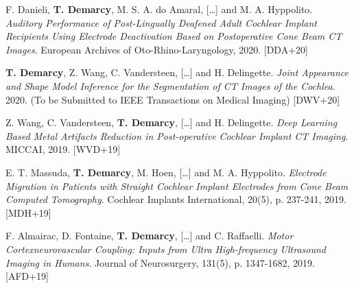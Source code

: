 



\begin{cvhonors}

  \cvhonor
    {F. Danieli, \textbf{T. Demarcy}, M. S. A. do Amaral, [\ldots] and M. A. Hyppolito.  \textit{Auditory Performance of Post-Lingually Deafened Adult Cochlear Implant Recipients Using Electrode Deactivation Based on Postoperative Cone Beam CT Images}. European Archives of Oto-Rhino-Laryngology, 2020.} %
    {\hypertarget{DDA+20}{[DDA+20]}} %

  \cvhonor
    {\textbf{T. Demarcy}, Z. Wang, C. Vandersteen, [\ldots] and H. Delingette.  \textit{Joint Appearance and Shape Model Inference for the Segmentation of CT Images of the Cochlea}. 2020. (To be Submitted to IEEE Transactions on Medical Imaging)} %
    {\hypertarget{DWV+20}{[DWV+20]}} %
    
  \cvhonor
    {Z. Wang, C. Vandersteen, \textbf{T. Demarcy}, [\ldots] and H. Delingette.  \textit{Deep Learning Based Metal Artifacts Reduction in Post-operative Cochlear Implant CT Imaging}. MICCAI, 2019.} %
    {\hypertarget{WVD+19}{[WVD+19]}} %
      
  \cvhonor
    {E. T. Massuda, \textbf{T. Demarcy}, M. Hoen, [\ldots] and M. A. Hyppolito.  \textit{Electrode Migration in Patients with Straight Cochlear Implant Electrodes from Cone Beam Computed Tomography}. Cochlear Implants International, 20(5), p. 237-241, 2019.} %
    {\hypertarget{MDH+19}{[MDH+19]}} %
    
  \cvhonor
    {F. Almairac, D. Fontaine, \textbf{T. Demarcy}, [\ldots]  and  C.  Raffaelli.   \textit{Motor  Cortexneurovascular Coupling: Inputs from Ultra High-frequency Ultrasound Imaging in Humans}. Journal of Neurosurgery, 131(5), p. 1347-1682, 2019.} %
    {\hypertarget{AFD+19}{[AFD+19]}} %
    

\end{cvhonors}
